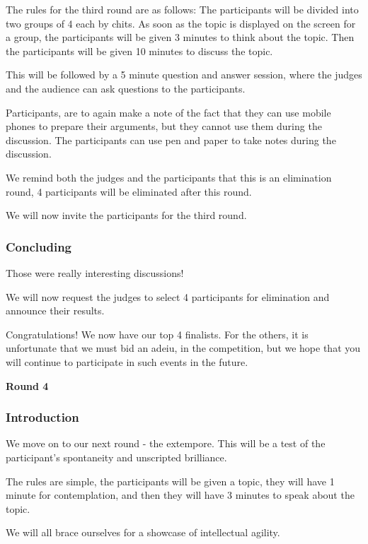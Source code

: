 \documentclass{report}
\begin{document}
The rules for the third round are as follows:
The participants will be divided into two groups of 4 each by chits.
As soon as the topic is displayed on the screen for a group, the participants will be given 3 minutes to think about the topic.
Then the participants will be given 10 minutes to discuss the topic. 

This will be followed by a 5 minute question and answer session, where the judges and the audience can ask questions to the participants.

Participants, are to again make a note of the fact that they can use mobile phones to prepare their arguments, but they cannot use them during the discussion.
The participants can use pen and paper to take notes during the discussion.

We remind both the judges and the participants that this is an elimination round, 4 participants will be eliminated after this round.

We will now invite the participants for the third round.

\subsubsection*{Concluding}
Those were really interesting discussions!

We will now request the judges to select 4 participants for elimination and announce their results.


Congratulations! We now have our top 4 finalists.
For the others, it is unfortunate that we must bid an adeiu, in the competition, but we hope that you will continue to participate in such events in the future.


\begin{center}
    \large
    \textbf{Round 4} 
\end{center}

\subsubsection*{Introduction}
We move on to our next round - the extempore. This will be a test of the participant's spontaneity and unscripted brilliance.

The rules are simple, the participants will be given a topic, they will have 1 minute for contemplation, and then 
they will have 3 minutes to speak about the topic.

We will all brace ourselves for a showcase of intellectual agility.
\end{document}
